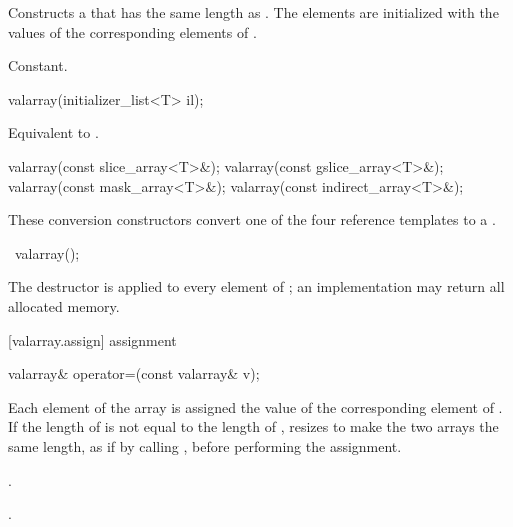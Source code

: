 \begin{itemdescr}
\pnum
\effects
Constructs a  that has the same length as .
The elements are initialized with the values of the corresponding
elements of .

\pnum
\complexity Constant.
\end{itemdescr}

%
\begin{itemdecl}
valarray(initializer_list<T> il);
\end{itemdecl}

\begin{itemdescr}
\pnum
\effects Equivalent to .
\end{itemdescr}

%
\begin{itemdecl}
valarray(const slice_array<T>&);
valarray(const gslice_array<T>&);
valarray(const mask_array<T>&);
valarray(const indirect_array<T>&);
\end{itemdecl}

\begin{itemdescr}
\pnum
These conversion constructors convert one of the four reference templates
to a
.
\end{itemdescr}

%
\begin{itemdecl}
~valarray();
\end{itemdecl}

\begin{itemdescr}
\pnum
\effects
The destructor is applied to every element of
;
an implementation may return all allocated memory.
\end{itemdescr}

[valarray.assign]{ assignment}

%
\begin{itemdecl}
valarray& operator=(const valarray& v);
\end{itemdecl}

\begin{itemdescr}
\pnum
\effects
Each element of the
array is assigned the value of the corresponding element of .
If the length of  is not equal to the length of ,
resizes  to make the two arrays the same length,
as if by calling , before performing the assignment.

\pnum
\postconditions {}.

\pnum
\returns {}.
\end{itemdescr}

